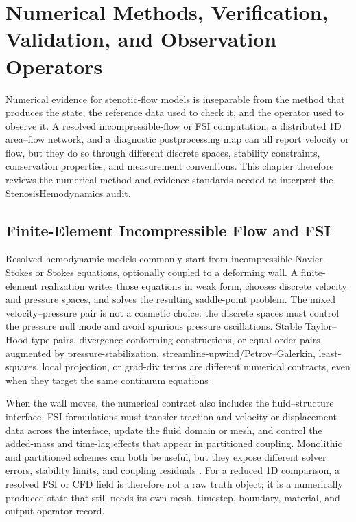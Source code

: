 \section{Numerical Methods, Verification, Validation, and Observation Operators}
\label{sec:numerical-methods}
\label{sec:numerical-methods-review}

Numerical evidence for stenotic-flow models is inseparable from the method that
produces the state, the reference data used to check it, and the operator used to
observe it. A resolved incompressible-flow or FSI computation, a distributed 1D
area--flow network, and a diagnostic postprocessing map can all report velocity
or flow, but they do so through different discrete spaces, stability
constraints, conservation properties, and measurement conventions. This chapter
therefore reviews the numerical-method and evidence standards needed to interpret
the StenosisHemodynamics audit.

\subsection{Finite-Element Incompressible Flow and FSI}
\label{subsec:numerical-methods-fem-fsi}

Resolved hemodynamic models commonly start from incompressible Navier--Stokes or
Stokes equations, optionally coupled to a deforming wall. A finite-element
realization writes those equations in weak form, chooses discrete velocity and
pressure spaces, and solves the resulting saddle-point problem. The mixed
velocity--pressure pair is not a cosmetic choice: the discrete spaces must
control the pressure null mode and avoid spurious pressure oscillations. Stable
Taylor--Hood-type pairs, divergence-conforming constructions, or equal-order
pairs augmented by pressure-stabilization, streamline-upwind/Petrov--Galerkin,
least-squares, local projection, or grad-div terms are different numerical
contracts, even when they target the same continuum equations
\cite{GaldiEtAl2008HemodynamicalFlows}.

When the wall moves, the numerical contract also includes the fluid--structure
interface. FSI formulations must transfer traction and velocity or displacement
data across the interface, update the fluid domain or mesh, and control the
added-mass and time-lag effects that appear in partitioned coupling. Monolithic
and partitioned schemes can both be useful, but they expose different solver
errors, stability limits, and coupling residuals
\cite{FormaggiaEtAl2007FSICoupling,QuarteroniVeneziani2003GeometricalMultiscale}.
For a reduced 1D comparison, a resolved FSI or CFD field is therefore not a raw
truth object; it is a numerically produced state that still needs its own mesh,
timestep, boundary, material, and output-operator record.

